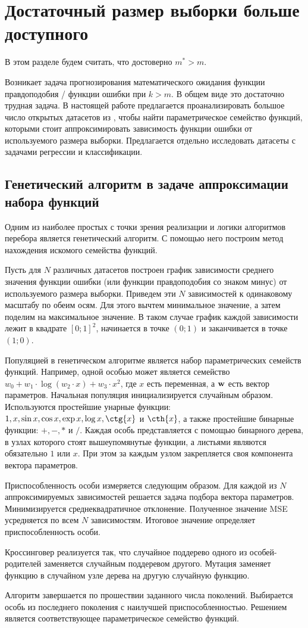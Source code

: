 \section{Достаточный размер выборки больше доступного}\label{sec3}

В этом разделе будем считать, что достоверно $m^* > m$.

Возникает задача прогнозирования математического ожидания функции правдоподобия / функции ошибки при $k > m$. В общем виде это достаточно трудная задача. В настоящей работе предлагается проанализировать большое число открытых датасетов из \citep{UCI}, чтобы найти параметрическое семейство функций, которыми стоит аппроксимировать зависимость функции ошибки от используемого размера выборки. Предлагается отдельно исследовать датасеты с задачами регрессии и классификации.

\subsection{Генетический алгоритм в задаче аппроксимации набора функций}\label{ga}

Одним из наиболее простых с точки зрения реализации и логики алгоритмов перебора является генетический алгоритм. С помощью него построим метод нахождения искомого семейства функций. 

Пусть для $N$ различных датасетов построен график зависимости среднего значения функции ошибки (или функции правдоподобия со знаком минус) от используемого размера выборки. Приведем эти $N$ зависимостей к одинаковому масштабу по обеим осям. Для этого вычтем минимальное значение, а затем поделим на максимальное значение. В таком случае график каждой зависимости лежит в квадрате $[0; 1]^2$, начинается в точке $(0; 1)$ и заканчивается в точке $(1; 0)$.

Популяцией в генетическом алгоритме является набор параметрических семейств функций.
Например, одной особью может является семейство $w_0 + w_1 \cdot \log(w_2 \cdot x) + w_3 \cdot x^2$, где $x$ есть переменная, а $\mathbf{w}$ есть вектор параметров. Начальная популяция инициализируется случайным образом. Используются простейшие унарные функции: $1, x, \sin{x}, \cos{x}, \exp{x}, \log{x}, \ctg{x}$ и $\cth{x}$, а также простейшие бинарные функции: $+, -, *$ и $/$. Каждая особь представляется с помощью бинарного дерева, в узлах которого стоят вышеупомянутые функции, а листьями являются обязательно $1$ или $x$. При этом за каждым узлом закрепляется своя компонента вектора параметров.

Приспособленность особи измеряется следующим образом. Для каждой из $N$ аппроксимируемых зависимостей решается задача подбора вектора параметров. Минимизируется среднеквадратичное отклонение. Полученное значение MSE усредняется по всем $N$ зависимостям. Итоговое значение определяет приспособленность особи.

Кроссинговер реализуется так, что случайное поддерево одного из особей-родителей заменяется случайным поддеревом другого. Мутация заменяет функцию в случайном узле дерева на другую случайную функцию. 

Алгоритм завершается по прошествии заданного числа поколений. Выбирается особь из последнего поколения с наилучшей приспособленностью. Решением является соответствующее параметрическое семейство функций.